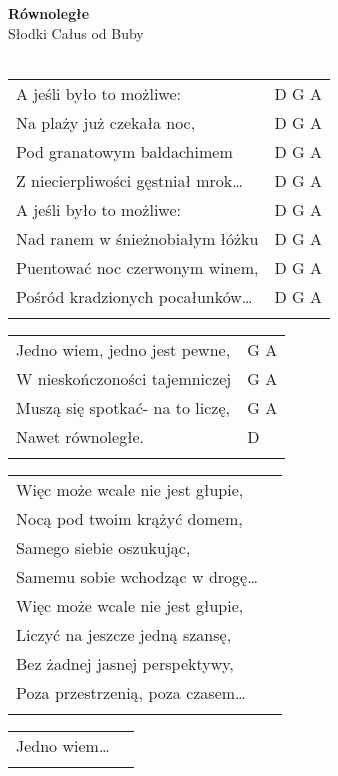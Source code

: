 \documentclass[a5paper]{article}
\begin{document}


\noindent
\fontsize{12pt}{15pt}\selectfont
\textbf{Równoległe} \\
\fontsize{8pt}{10pt}\selectfont
Słodki Całus od Buby \\ \\
\fontsize{10pt}{12pt}\selectfont
{}
\begin{tabular}{@{}p{6.50cm}p{3cm}@{}}
\noindent
A jeśli było to możliwe: & D G A \\
Na plaży już czekała noc, & D G A \\
Pod granatowym baldachimem & D G A \\
Z niecierpliwości gęstniał mrok… & D G A \\
A jeśli było to możliwe: & D G A \\
Nad ranem w śnieżnobiałym łóżku & D G A \\
Puentować noc czerwonym winem, & D G A \\
Pośród kradzionych pocałunków… & D G A \\ \\
\end{tabular}

\noindent
\begin{tabular}{@{}p{5.50cm}p{3cm}@{}}
Jedno wiem, jedno jest pewne, & G A \\
W nieskończoności tajemniczej & G A \\
Muszą się spotkać- na to liczę, & G A \\
Nawet równoległe. & D \\ \\
\end{tabular}

\noindent
\begin{tabular}{@{}p{6.50cm}p{3cm}@{}}
Więc może wcale nie jest głupie, \\
Nocą pod twoim krążyć domem, \\
Samego siebie oszukując, \\
Samemu sobie wchodząc w drogę… \\
Więc może wcale nie jest głupie, \\
Liczyć na jeszcze jedną szansę, \\
Bez żadnej jasnej perspektywy, \\
Poza przestrzenią, poza czasem… \\ \\
\end{tabular}

\noindent
\begin{tabular}{@{}p{5.50cm}p{3cm}@{}}
Jedno wiem… \\ \\
\end{tabular}
\end{document}

